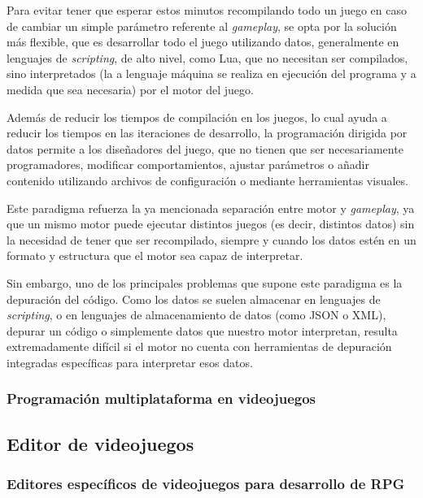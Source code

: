 \smallskip

Para evitar tener que esperar estos minutos recompilando todo un juego en caso de cambiar un simple parámetro referente al \textit{gameplay}, se opta por la solución más flexible, que es desarrollar todo el juego utilizando datos, generalmente en lenguajes de \textit{scripting}, de alto nivel, como Lua, que no necesitan ser compilados, sino interpretados (la  a lenguaje máquina se realiza en ejecución del programa y a medida que sea necesaria) por el motor del juego.

\medskip

Además de reducir los tiempos de compilación en los juegos, lo cual ayuda a reducir los tiempos en las iteraciones de desarrollo, la programación dirigida por datos permite a los diseñadores del juego, que no tienen que ser necesariamente programadores, modificar comportamientos, ajustar parámetros o añadir contenido utilizando archivos de configuración o mediante herramientas visuales.

\medskip

Este paradigma refuerza la ya mencionada separación entre motor y \textit{gameplay}, ya que un mismo motor puede ejecutar distintos juegos (es decir, distintos datos) sin la necesidad de tener que ser recompilado, siempre y cuando los datos estén en un formato y estructura que el motor sea capaz de interpretar.

\medskip

Sin embargo, uno de los principales problemas que supone este paradigma es la depuración del código. Como los datos se suelen almacenar en lenguajes de \textit{scripting}, o en lenguajes de almacenamiento de datos (como JSON o XML), depurar un código o simplemente datos que nuestro motor interpretan, resulta extremadamente difícil si el motor no cuenta con herramientas de depuración integradas específicas para interpretar esos datos.

\subsubsection{Programación multiplataforma en videojuegos}

\subsection{Editor de videojuegos} \label{sec:editorvj}

\subsubsection{Editores específicos de videojuegos para desarrollo de RPG}

